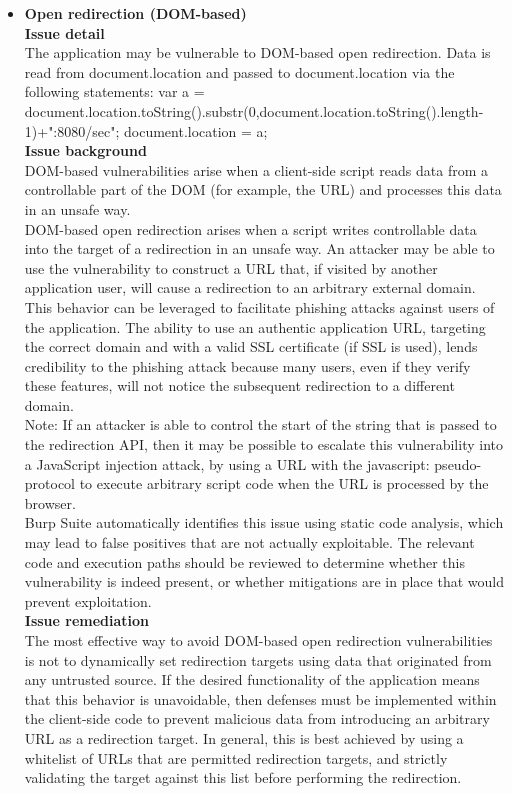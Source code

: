 \begin{itemize}
\item \textbf{Open redirection (DOM-based)} \\

\textbf{Issue detail} \\
The application may be vulnerable to DOM-based open redirection. Data is read from document.location and passed to document.location via the following statements:
var a = document.location.toString().substr(0,document.location.toString().length-1)+":8080/sec";
document.location = a; \\

\textbf{Issue background} \\
DOM-based vulnerabilities arise when a client-side script reads data from a controllable part of the DOM (for example, the URL) and processes this data in an unsafe way. \\

DOM-based open redirection arises when a script writes controllable data into the target of a redirection in an unsafe way. An attacker may be able to use the vulnerability to construct a URL that, if visited by another application user, will cause a redirection to an arbitrary external domain. This behavior can be leveraged to facilitate phishing attacks against users of the application. The ability to use an authentic application URL, targeting the correct domain and with a valid SSL certificate (if SSL is used), lends credibility to the phishing attack because many users, even if they verify these features, will not notice the subsequent redirection to a different domain. \\

Note: If an attacker is able to control the start of the string that is passed to the redirection API, then it may be possible to escalate this vulnerability into a JavaScript injection attack, by using a URL with the javascript: pseudo-protocol to execute arbitrary script code when the URL is processed by the browser. \\

Burp Suite automatically identifies this issue using static code analysis, which may lead to false positives that are not actually exploitable. The relevant code and execution paths should be reviewed to determine whether this vulnerability is indeed present, or whether mitigations are in place that would prevent exploitation.\\

\textbf{Issue remediation} \\
The most effective way to avoid DOM-based open redirection vulnerabilities is not to dynamically set redirection targets using data that originated from any untrusted source. If the desired functionality of the application means that this behavior is unavoidable, then defenses must be implemented within the client-side code to prevent malicious data from introducing an arbitrary URL as a redirection target. In general, this is best achieved by using a whitelist of URLs that are permitted redirection targets, and strictly validating the target against this list before performing the redirection.


\end{itemize}
